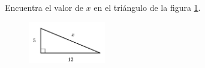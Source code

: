 \question[15]  Encuentra el valor de $x$ en el triángulo de la figura \ref{fig:lados_pitagoras_03}.
\begin{figure}[H]
    \begin{center}
        \includegraphics[width=0.3\textwidth]{../images/lados_pitagoras_03.png}
    \end{center}
    \caption{}
    \label{fig:lados_pitagoras_03}
\end{figure}